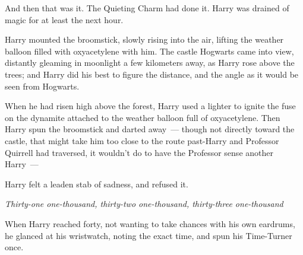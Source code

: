 And then that was it. The Quieting Charm had done it. Harry was drained of
magic for at least the next hour.

Harry mounted the broomstick, slowly rising into the air, lifting the weather
balloon filled with oxyacetylene with him. The castle Hogwarts came into view,
distantly gleaming in moonlight a few kilometers away, as Harry rose above the
trees; and Harry did his best to figure the distance, and the angle as it would
be seen from Hogwarts.

When he had risen high above the forest, Harry used a lighter to ignite the
fuse on the dynamite attached to the weather balloon full of oxyacetylene. Then
Harry spun the broomstick and darted away~--- though not directly toward the
castle, that might take him too close to the route past-Harry and Professor
Quirrell had traversed, it wouldn't do to have the Professor sense another
Harry~---

Harry felt a leaden stab of sadness, and refused it.

\emph{Thirty-one one-thousand, thirty-two one-thousand, thirty-three
one-thousand{\el}}

When Harry reached forty, not wanting to take chances with his own eardrums, he
glanced at his wristwatch, noting the exact time, and spun his Time-Turner
once.
